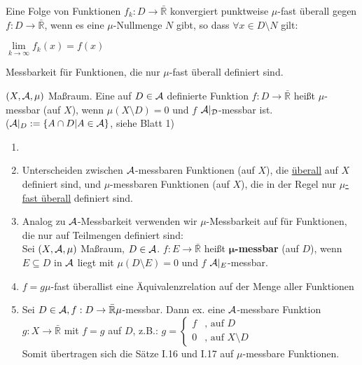 \documentclass[11pt,a4paper,fleqn,openany]{report}
\begin{document}
    \begin{example}
      Eine Folge von Funktionen $f_k:D \to \bar{\mathbb{R}}$ konvergiert punktweise $\mu$-fast überall gegen $f: D \to \bar{\mathbb{R}}$, wenn es eine $\mu$-Nullmenge $N$ gibt, so dass $\forall x \in D \setminus N$ gilt:
      \begin{center}
        $\lim\limits_{k \to \infty} f_k(x) = f(x)$
      \end{center}
    \end{example}

    \begin{goal}
      Messbarkeit für Funktionen, die nur $\mu$-fast überall definiert sind.
    \end{goal}

    \begin{definition}
      $(X, \mathcal{A}, \mu)$ Maßraum. Eine auf $D \in \mathcal{A}$ definierte Funktion $f: D \to \bar{\mathbb{R}}$ heißt $\mu$-messbar (auf $X$), wenn $\mu(X \setminus D) = 0$ und $f$ $\mathcal{A|_D}$-messbar ist.\\
      ($\mathcal{A}|_D := \{A \cap D | A \in \mathcal{A}\}$, siehe Blatt 1)
    \end{definition}

    \begin{remark}
      \begin{enumerate}
        \item[]
        \item Unterscheiden zwischen $\mathcal{A}$-messbaren Funktionen (auf $X$), die \underline{überall} auf $X$ definiert sind, und $\mu$-messbaren Funktionen (auf $X$), die in der Regel nur \underline{$\mu$-fast überall} definiert sind.
        \item Analog zu $\mathcal{A}$-Messbarkeit verwenden wir $\mu$-Messbarkeit auf für Funktionen, die nur auf Teilmengen definiert sind:\\
          Sei $(X, \mathcal{A}, \mu)$ Maßraum, $D \in \mathcal{A}$. $f: E \to \bar{\mathbb{R}}$ heißt \textbf{$\bm{\mu}$-messbar} (auf $D$), wenn $E \subseteq D$ in $\mathcal{A}$ liegt mit $\mu(D \setminus E) = 0$ und $f$ $\mathcal{A}|_E$-messbar.
        \item \glqq$f=g \mu$-fast überall\grqq ist eine Äquivalenzrelation auf der Menge aller Funktionen
        \item Sei $D \in \mathcal{A}, f: D \to \bar{\mathbb{R}} \mu$-messbar. Dann ex. eine $\mathcal{A}$-messbare Funktion $g: X \to \bar{\mathbb{R}}$ mit $f=g$ auf $D$, z.B.: $g = \begin{cases}
          f & \text{, auf } D\\
          0 & \text{, auf } X \setminus D 
        \end{cases}$\\
        Somit übertragen sich die Sätze I.16 und I.17 auf $\mu$-messbare Funktionen.
      \end{enumerate}
    \end{remark}
\end{document}
